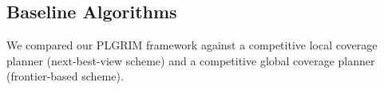 \documentclass[letterpaper]{article} %
\begin{document}
















\subsection{Baseline Algorithms}
We compared our PLGRIM framework against a competitive local coverage planner (next-best-view scheme) and a competitive global coverage planner (frontier-based scheme). 
\end{document}
